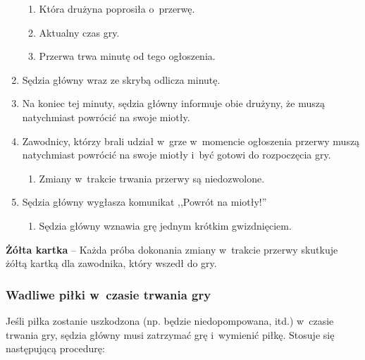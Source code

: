 \documentclass[12pt,a4paper]{article}
\newcommand\yellowcard[1]{\bgroup\textcolor{darkyellow}{\textbf{#1}}}
\begin{document}
\begin{enumerate}
	      \begin{enumerate}
		      \item
		            Która drużyna poprosiła o~przerwę.
		      \item
		            Aktualny czas gry.
		      \item
		            Przerwa trwa minutę od tego ogłoszenia.
	      \end{enumerate}
	\item
	      Sędzia główny wraz ze skrybą odlicza minutę.
	\item
	      Na koniec tej minuty, sędzia główny informuje obie drużyny, że muszą
	      natychmiast powrócić na swoje miotły.
	\item
	      Zawodnicy, którzy brali udział w~grze w~momencie ogłoszenia przerwy
	      muszą natychmiast powrócić na swoje miotły i~być gotowi do rozpoczęcia
	      gry.

	      \begin{enumerate}
		      \item
		            Zmiany w~trakcie trwania przerwy są niedozwolone.
	      \end{enumerate}
	\item
	      Sędzia główny wygłasza komunikat ,,Powrót na miotły!''

	      \begin{enumerate}
		      \item
		            Sędzia główny wznawia grę jednym krótkim gwizdnięciem.
	      \end{enumerate}
\end{enumerate}

\yellowcard{Żółta kartka} -- Każda próba dokonania zmiany w~trakcie przerwy
skutkuje żółtą kartką dla zawodnika, który wszedł do gry.

\subsubsection{Wadliwe piłki w~czasie trwania gry}

Jeśli piłka zostanie uszkodzona (np. będzie niedopompowana, itd.) w~czasie trwania gry, sędzia główny musi zatrzymać grę i~wymienić piłkę.
Stosuje się następującą procedurę:
\end{document}

